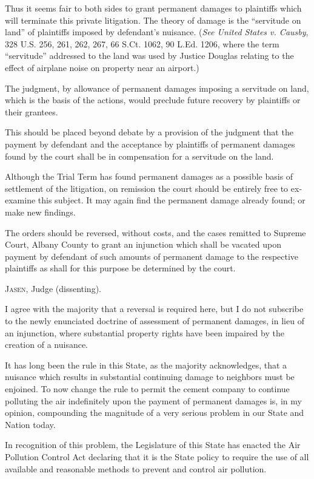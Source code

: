 Thus it seems fair to both sides to grant permanent damages to plaintiffs which
will terminate this private litigation. The theory of damage is the ``servitude
on land'' of plaintiffs imposed by defendant's nuisance. (\emph{See United
States v. Causby}, 328 U.S. 256, 261, 262, 267, 66 S.Ct. 1062, 90 L.Ed. 1206,
where the term ``servitude'' addressed to the land was used by Justice Douglas
relating to the effect of airplane noise on property near an airport.)

The judgment, by allowance of permanent damages imposing a servitude on land,
which is the basis of the actions, would preclude future recovery by plaintiffs
or their grantees.

This should be placed beyond debate by a provision of the judgment that the
payment by defendant and the acceptance by plaintiffs of permanent damages found
by the court shall be in compensation for a servitude on the land.

Although the Trial Term has found permanent damages as a possible basis of
settlement of the litigation, on remission the court should be entirely free to
ex-examine this subject. It may again find the permanent damage already found;
or make new findings.

The orders should be reversed, without costs, and the cases remitted to Supreme
Court, Albany County to grant an injunction which shall be vacated upon payment
by defendant of such amounts of permanent damage to the respective plaintiffs as
shall for this purpose be determined by the court.

\opinion \textsc{Jasen}, Judge (dissenting).

I agree with the majority that a reversal is required here, but I do not
subscribe to the newly enunciated doctrine of assessment of permanent damages,
in lieu of an injunction, where substantial property rights have been impaired
by the creation of a nuisance.

It has long been the rule in this State, as the majority acknowledges, that a
nuisance which results in substantial continuing damage to neighbors must be
enjoined. To now change the rule to permit the cement company to continue
polluting the air indefinitely upon the payment of permanent damages is, in my
opinion, compounding the magnitude of a very serious problem in our State and
Nation today.

In recognition of this problem, the Legislature of this State has enacted the
Air Pollution Control Act declaring that it is the State policy to require the
use of all available and reasonable methods to prevent and control air
pollution.


